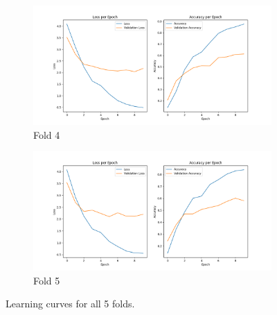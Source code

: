 \documentclass[10pt,english,a4paper]{report}
\begin{document}
\begin{figure}[!ht]
    \vspace{1em}
   
    \begin{subfigure}[b]{0.4\textwidth}
        \includegraphics[width=\textwidth]{figures/training/learning_curve_fold_4.png}
        \caption{Fold 4}
        \label{fig:plot4}
    \end{subfigure}
    \hfill
    \begin{subfigure}[b]{0.4\textwidth}
        \includegraphics[width=\textwidth]{figures/training/learning_curve_fold_5.png}
        \caption{Fold 5}
        \label{fig:plot5}
    \end{subfigure}
   
    \caption{Learning curves for all 5 folds.}
    \label{fig:all_folds}
\end{figure}
\end{document}
